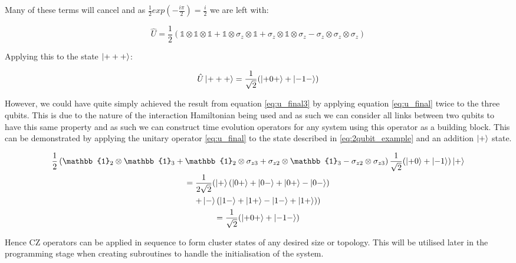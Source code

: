 Many of these terms will cancel and as $\frac{1}{2} exp(-\frac{i \pi}{2}) = \frac{i}{2}$ we are left with:

\begin{equation}
\label{eq:u_final3}
\hat{U} = \frac{1}{2}(
  \mathbb{1} \otimes \mathbb{1} \otimes \mathbb{1}
+ \mathbb{1} \otimes \sigma_{z} \otimes \mathbb{1} 
+ \sigma_{z} \otimes \mathbb{1} \otimes \sigma_{z}
- \sigma_{z} \otimes \sigma_{z} \otimes \sigma_{z}
)
\end{equation}

Applying this to the state $\ket{+ + +}$:

\begin{equation}
\label{eq:3plus_2cz}
\hat{U} \ket{+ + +}= \frac{1}{\sqrt{2}}(\ket{+0+} + \ket{-1-})
\end{equation}

However, we could have quite simply achieved the result from equation \eqref{eq:u_final3} by applying equation \eqref{eq:u_final} twice to the three qubits. This is due to the nature of the interaction Hamiltonian being used and as such we can consider all links between two qubits to have this same property and as such we can construct time evolution operators for any system using this operator as a building block. This can be demonstrated by applying the unitary operator \eqref{eq:u_final} to the state described in \eqref{eq:2qubit_example} and an addition $\ket{+}$ state.

\begin{multline}
\frac{1}{2}
\left( \mathbb{1}_{2} \otimes \mathbb{1}_{3}
+ \mathbb{1}_{2} \otimes \sigma_{z3}
+ \sigma_{z2} \otimes \mathbb{1}_{3}
- \sigma_{z2} \otimes \sigma_{z3}\right) 
\frac{1}{\sqrt{2}} (\ket{+ 0} + \ket{- 1}) \ket{+}\\
= \frac{1}{2\sqrt{2}} (\ket{+}(\ket{0 +} + \ket{0 -} + \ket{0 +} - \ket{0 -}) \\
 + \ket{-}(\ket{1 -} + \ket{1 +} - \ket{1 -} + \ket{1 +}))\\
= \frac{1}{\sqrt{2}} (\ket{+ 0 +} + \ket{- 1 -}) \\
\end{multline}

Hence CZ operators can be applied in sequence to form cluster states of any desired size or topology. This will be utilised later in the programming stage when creating subroutines to handle the initialisation of the system.


